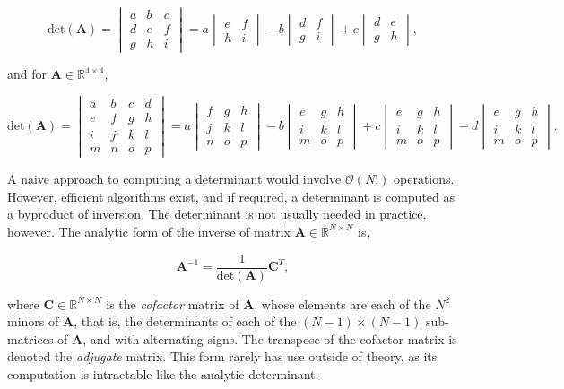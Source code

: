 \documentclass[11pt]{amsart}
\begin{document}
$$
\text{det}(\mathbf{A}) =
\begin{vmatrix}
a&b&c\\
d&e&f\\
g&h&i
\end{vmatrix} =
a\begin{vmatrix}
e&f\\
h&i
\end{vmatrix} -
b\begin{vmatrix}
d&f\\
g&i
\end{vmatrix} +
c\begin{vmatrix}
d&e\\
g&h
\end{vmatrix},
$$

and for $\mathbf{A} \in \mathbb{R}^{4 \times 4}$,

$$
\text{det}(\mathbf{A}) =
\begin{vmatrix}
a&b&c&d\\
e&f&g&h\\
i&j&k&l\\
m&n&o&p
\end{vmatrix} =
a\begin{vmatrix}
f&g&h\\
j&k&l\\
n&o&p
\end{vmatrix} -
b\begin{vmatrix}
e&g&h\\
i&k&l\\
m&o&p
\end{vmatrix} +
c\begin{vmatrix}
e&g&h\\
i&k&l\\
m&o&p
\end{vmatrix} -
d\begin{vmatrix}
e&g&h\\
i&k&l\\
m&o&p
\end{vmatrix}.
$$

A naive approach to computing a determinant would involve $\mathcal{O}(N!)$ operations. However, efficient algorithms exist, and if required, a determinant is computed as a byproduct of inversion. The determinant is not usually needed in practice, however. The analytic form of the inverse of matrix $\mathbf{A} \in \mathbb{R}^{N \times N}$ is,

$$\mathbf{A}^{-1} = \frac{1}{\text{det}(\mathbf{A})}\mathbf{C}^{T},$$

where $\mathbf{C} \in \mathbb{R}^{N \times N}$ is the \emph{cofactor} matrix of $\mathbf{A}$, whose elements are each of the $N^2$ minors of $\mathbf{A}$, that is, the determinants of each of the $(N - 1) \times (N - 1)$ sub-matrices of $\mathbf{A}$, and with alternating signs. The transpose of the cofactor matrix is denoted the \emph{adjugate} matrix. This form rarely has use outside of theory, as its computation is intractable like the analytic determinant.
\end{document}
